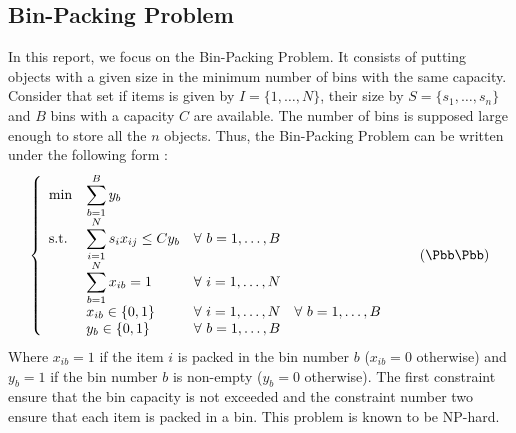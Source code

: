 \subsection{Bin-Packing Problem}

In this report, we focus on the Bin-Packing Problem. It consists of putting objects with a given size in the minimum number of bins with the same capacity. Consider that set if items is given by $I = \{1,\dots,N\}$, their size by $S = \{s_1,\dots,s_n\}$ and $B$ bins with a capacity $C$ are available. The number of bins is supposed large enough to store all the $n$ objects. Thus, the Bin-Packing Problem can be written under the following form :
\begin{equation}
	\label{BPP-classic}
	\left \{
	\begin{array}{*5{>{\displaystyle}l}}
	\min & \sum_{b=1}^B{y_b} \\
	\st & \sum_{i=1}^N s_i x_{ij} \leq C y_b & \forall \ b = 1,\dots,B \\
	& \sum_{b=1}^N x_{ib} = 1 & \forall \ i = 1,\dots,N \\
	& x_{ib} \in \{0,1\} & \forall \ i=1,\dots,N & \forall \ b = 1,\dots,B \\
	& y_{b} \in \{0,1\} &  \forall \ b = 1,\dots,B
	\end{array}
	\right.
	\tag{$\Bbb\Pbb\Pbb$}
\end{equation}
Where $x_{ib}=1$ if the item $i$ is packed in the bin number $b$ ($x_{ib}=0$ otherwise) and $y_b=1$ if the bin number $b$ is non-empty ($y_b=0$ otherwise). The first constraint ensure that the bin capacity is not exceeded and the constraint number two ensure that each item is packed in a bin. This problem is known to be NP-hard.
